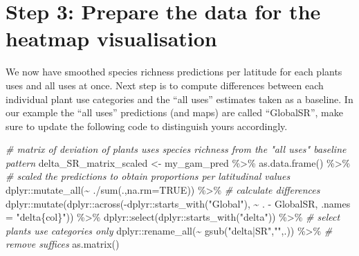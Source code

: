 \documentclass[
]{article}
\newenvironment{Shaded}{\begin{snugshade}}{\end{snugshade}}
\newcommand{\AttributeTok}[1]{\textcolor[rgb]{0.77,0.63,0.00}{#1}}
\newcommand{\CommentTok}[1]{\textcolor[rgb]{0.56,0.35,0.01}{\textit{#1}}}
\newcommand{\ConstantTok}[1]{\textcolor[rgb]{0.00,0.00,0.00}{#1}}
\newcommand{\FunctionTok}[1]{\textcolor[rgb]{0.00,0.00,0.00}{#1}}
\newcommand{\NormalTok}[1]{#1}
\newcommand{\OtherTok}[1]{\textcolor[rgb]{0.56,0.35,0.01}{#1}}
\newcommand{\SpecialCharTok}[1]{\textcolor[rgb]{0.00,0.00,0.00}{#1}}
\newcommand{\StringTok}[1]{\textcolor[rgb]{0.31,0.60,0.02}{#1}}
\begin{document}
\hypertarget{step-3-prepare-the-data-for-the-heatmap-visualisation}{%
\section{Step 3: Prepare the data for the heatmap
visualisation}\label{step-3-prepare-the-data-for-the-heatmap-visualisation}}

We now have smoothed species richness predictions per latitude for each
plants uses and all uses at once. Next step is to compute differences
between each individual plant use categories and the ``all uses''
estimates taken as a baseline. In our example the ``all uses''
predictions (and maps) are called ``GlobalSR'', make sure to update the
following code to distinguish yours accordingly.

\begin{Shaded}
\begin{Highlighting}[]

\CommentTok{\# matrix of deviation of plants uses\textquotesingle{} species richness from the "all uses" baseline pattern}
\NormalTok{delta\_SR\_matrix\_scaled }\OtherTok{\textless{}{-}}\NormalTok{ my\_gam\_pred }\SpecialCharTok{\%\textgreater{}\%}
  \FunctionTok{as.data.frame}\NormalTok{() }\SpecialCharTok{\%\textgreater{}\%}
  \CommentTok{\# scaled the predictions to obtain proportions per latitudinal values}
\NormalTok{  dplyr}\SpecialCharTok{::}\FunctionTok{mutate\_all}\NormalTok{(}\SpecialCharTok{\textasciitilde{}}\NormalTok{ .}\SpecialCharTok{/}\FunctionTok{sum}\NormalTok{(.,}\AttributeTok{na.rm=}\ConstantTok{TRUE}\NormalTok{)) }\SpecialCharTok{\%\textgreater{}\%} 
  \CommentTok{\# calculate differences}
\NormalTok{  dplyr}\SpecialCharTok{::}\FunctionTok{mutate}\NormalTok{(dplyr}\SpecialCharTok{::}\FunctionTok{across}\NormalTok{(}\SpecialCharTok{{-}}\NormalTok{dplyr}\SpecialCharTok{::}\FunctionTok{starts\_with}\NormalTok{(}\StringTok{"Global"}\NormalTok{),}
                              \SpecialCharTok{\textasciitilde{}}\NormalTok{ . }\SpecialCharTok{{-}}\NormalTok{ GlobalSR, }\AttributeTok{.names =} \StringTok{"delta\{col\}"}\NormalTok{)) }\SpecialCharTok{\%\textgreater{}\%} 
\NormalTok{  dplyr}\SpecialCharTok{::}\FunctionTok{select}\NormalTok{(dplyr}\SpecialCharTok{::}\FunctionTok{starts\_with}\NormalTok{(}\StringTok{"delta"}\NormalTok{)) }\SpecialCharTok{\%\textgreater{}\%} \CommentTok{\# select plants use categories only}
\NormalTok{  dplyr}\SpecialCharTok{::}\FunctionTok{rename\_all}\NormalTok{(}\SpecialCharTok{\textasciitilde{}} \FunctionTok{gsub}\NormalTok{(}\StringTok{"delta|SR"}\NormalTok{,}\StringTok{""}\NormalTok{,.)) }\SpecialCharTok{\%\textgreater{}\%} \CommentTok{\# remove suffices}
  \FunctionTok{as.matrix}\NormalTok{()}


\end{Highlighting}
\end{Shaded}
\end{document}
